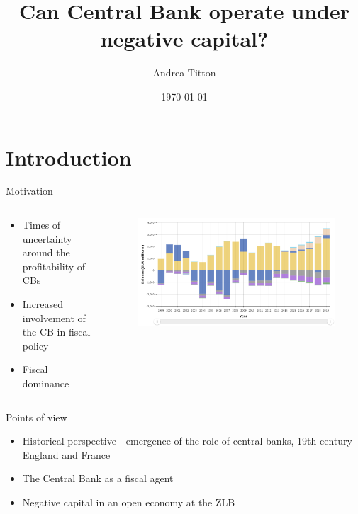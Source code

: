 \documentclass{beamer}
\title{Can Central Bank operate under negative capital?}
\author{Andrea Titton}
\date{\today}
\begin{document}
\begin{frame}[plain]
    \titlepage
\end{frame}

\section{Introduction}

\begin{frame}{Motivation}
    \begin{columns}
        \begin{column}{.49\textwidth}
            \begin{itemize}
                \setlength\itemsep{1em}
                \item Times of uncertainty around the profitability of CBs
                \item Increased involvement of the CB in fiscal policy
                \item Fiscal dominance
            \end{itemize}
        \end{column}
        \begin{column}{.49\textwidth}
            \begin{figure}
                \includegraphics[width=\textwidth]{graphs/ecb-profits.PNG}
            \end{figure}
        \end{column}
    \end{columns}
\end{frame}

\begin{frame}{Points of view}
    \begin{itemize}
        \setlength\itemsep{1em}
        \item Historical perspective - emergence of the role of central banks, 19th century England and France
        \item The Central Bank as a fiscal agent
        \item Negative capital in an open economy at the ZLB
    \end{itemize}
\end{frame}
\end{document}
